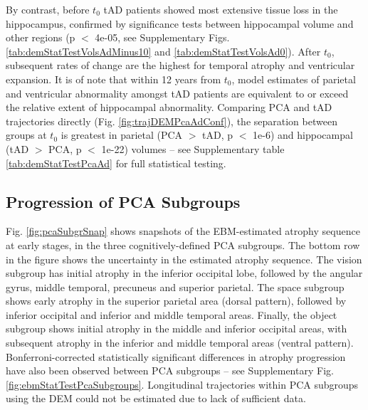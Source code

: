 By contrast, before $t_0$ tAD patients showed most extensive tissue loss in the hippocampus, confirmed by significance tests between hippocampal volume and other regions (p $<$ 4e-05, see Supplementary Figs. \ref{tab:demStatTestVolsAdMinus10} and \ref{tab:demStatTestVolsAd0}). After $t_0$, subsequent rates of change are the highest for temporal atrophy and ventricular expansion. It is of note that within 12 years from $t_0$, model estimates of parietal and ventricular abnormality amongst tAD patients are equivalent to or exceed the relative extent of hippocampal abnormality. Comparing PCA and tAD trajectories directly (Fig. \ref{fig:trajDEMPcaAdConf}), the separation between groups at $t_0$ is greatest in parietal (PCA $>$ tAD, p $<$ 1e-6) and hippocampal (tAD $>$ PCA, p $<$ 1e-22) volumes -- see Supplementary table \ref{tab:demStatTestPcaAd} for full statistical testing. 

\subsection{Progression of PCA Subgroups}
\label{sec:pcaResPcaSub}

Fig. \ref{fig:pcaSubgrSnap} shows snapshots of the EBM-estimated atrophy sequence at early stages, in the three cognitively-defined PCA subgroups. The bottom row in the figure shows the uncertainty in the estimated atrophy sequence. The vision subgroup has initial atrophy in the inferior occipital lobe, followed by the angular gyrus, middle temporal, precuneus and superior parietal. The space subgroup shows early atrophy in the superior parietal area (dorsal pattern), followed by inferior occipital and inferior and middle temporal areas. Finally, the object subgroup shows initial atrophy in the middle and inferior occipital areas, with subsequent atrophy in the inferior and middle temporal areas (ventral pattern). Bonferroni-corrected statistically significant differences in atrophy progression have also been observed between PCA subgroups -- see Supplementary Fig. \ref{fig:ebmStatTestPcaSubgroups}. Longitudinal trajectories within PCA subgroups using the DEM could not be estimated due to lack of sufficient data. 


